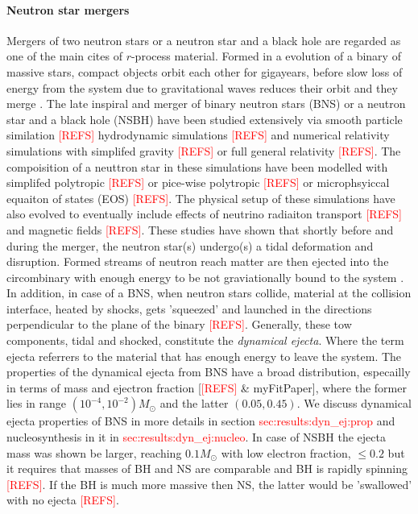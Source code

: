 \documentclass[11pt,a4paper,headinclude=true,DIV=14,BCOR=8mm,chapterprefix,listof=totoc,twoside,openright,abstracton]{scrbook}
\newcommand{\red}[1]{\textcolor{red}{#1}}
\begin{document}

\paragraph{Neutron star mergers}

Mergers of two neutron stars or a neutron star and a black hole are regarded as one of the main cites of $r$-process material. Formed in a evolution of a binary of massive stars, compact objects orbit each other for gigayears, before slow loss of energy from the system due to gravitational waves reduces their orbit and they merge \cite{Hulse:1975,Lattimer:2004sa,Price:2006fi}. 
The late inspiral and merger of binary neutron stars (BNS) or a neutron star and a black hole (NSBH) have been studied extensively via smooth particle similation \red{[REFS]} hydrodynamic simulations \red{[REFS]} and numerical relativity simulations with simplifed gravity \red{[REFS]} or full general relativity \red{[REFS]}. The compoisition of a neuttron star in these simulations have been modelled with simplifed polytropic \red{[REFS]} or pice-wise polytropic \red{[REFS]} or microphsyiccal equaiton of states (EOS) \red{[REFS]}. The physical setup of these simulations have also evolved to eventually include effects of neutrino radiaiton transport \red{[REFS]} and magnetic fields \red{[REFS]}. 
These studies have shown that shortly before and during the merger, the neutron star(s) undergo(s) a tidal deformation and disruption. Formed streams of neutron reach matter are then ejected into the circombinary with enough energy to be not graviationally bound to the system \cite{Price:2006fi,Foucart:2014nda,Sekiguchi:2015dma,Kyutoku:2015gda,Radice:2016dwd}. 
In addition, in case of a BNS, when neutron stars collide, material at the collision interface, heated by shocks, gets 'squeezed' and launched in the directions perpendicular to the plane of the binary \cite{Bauswein:2013,Hotokezaka:2013b} \red{[REFS]}. 
Generally, these tow components, tidal and shocked, constitute the \textit{dynamical ejecta}. Where the term ejecta referrers to the material that has enough energy to leave the system. 
The properties of the dynamical ejecta from BNS have a broad distribution, especailly in terms of mass and ejectron fraction [\red{[REFS]} \& myFitPaper], where the former lies in range $(10^{-4},10^{-2})M_{\odot}$ and the latter $(0.05,0.45)$. We discuss dynamical ejecta properties of BNS in more details in section \red{sec:results:dyn\_ej:prop} and nucleosynthesis in it in \red{sec:results:dyn\_ej:nucleo}. In case of NSBH the ejecta mass was shown be larger, reaching $0.1M_{\odot}$ with low electron fraction, $\leq0.2$ but it requires that masses of BH and NS are comparable and BH is rapidly spinning \cite{Foucart:2014nda}\red{[REFS]}. If the BH is much more massive then NS, the latter would be 'swallowed' with no ejecta \red{[REFS]}.
\end{document}
